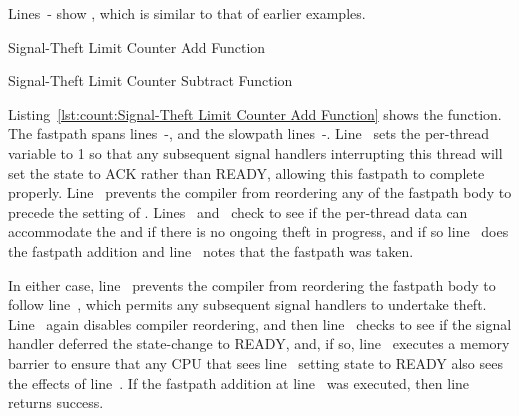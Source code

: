 \begin{lineref}
Lines~- show , which is similar to that of
earlier examples.
\end{lineref}

\begin{listing}[tbp]

\caption{Signal-Theft Limit Counter Add Function}
\label{lst:count:Signal-Theft Limit Counter Add Function}
\end{listing}

\begin{listing}[tb]

\caption{Signal-Theft Limit Counter Subtract Function}
\label{lst:count:Signal-Theft Limit Counter Subtract Function}
\end{listing}

\begin{lineref}
Listing~\ref{lst:count:Signal-Theft Limit Counter Add Function}
shows the  function.
The fastpath spans lines~-, and the slowpath
lines~-.
Line~ sets the per-thread  variable to 1 so that
any subsequent signal handlers interrupting this thread will
set the  state to ACK rather than READY, allowing this
fastpath to complete properly.
Line~ prevents the compiler from reordering any of the fastpath body
to precede the setting of .
Lines~ and~ check to see
if the per-thread data can accommodate
the  and if there is no ongoing theft in progress,
and if so line~ does the fastpath addition and
line~ notes that
the fastpath was taken.

In either case, line~ prevents the compiler from reordering the
fastpath body to follow line~, which permits any subsequent signal
handlers to undertake theft.
Line~ again disables compiler reordering, and then
line~
checks to see if the signal handler deferred the 
state-change to READY, and, if so, line~ executes a memory
barrier to ensure that any CPU that sees line~ setting state to
READY also sees the effects of line~.
If the fastpath addition at line~ was executed, then
line~ returns
success.
\end{lineref}

